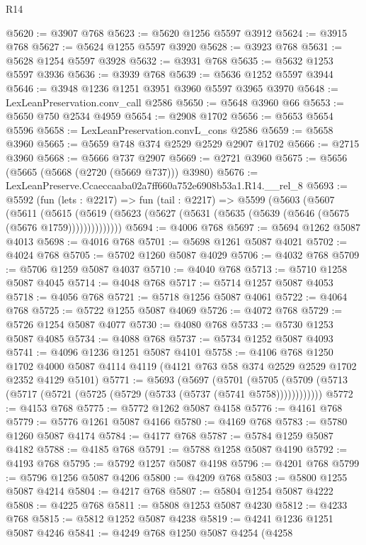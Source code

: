\begin{lexlean}{R14}
\begin{coremodule}
@5620 := @3907 @768
@5623 := @5620 @1256 @5597 @3912
@5624 := @3915 @768
@5627 := @5624 @1255 @5597 @3920
@5628 := @3923 @768
@5631 := @5628 @1254 @5597 @3928
@5632 := @3931 @768
@5635 := @5632 @1253 @5597 @3936
@5636 := @3939 @768
@5639 := @5636 @1252 @5597 @3944
@5646 := @3948 @1236 @1251 @3951 @3960 @5597 @3965 @3970
@5648 := LexLeanPreservation.conv_call @2586
@5650 := @5648 @3960 @66
@5653 := @5650 @750 @2534 @4959
@5654 := @2908 @1702
@5656 := @5653 @5654 @5596
@5658 := LexLeanPreservation.convL_cons @2586
@5659 := @5658 @3960
@5665 := @5659 @748 @374 @2529 @2529 @2907 @1702
@5666 := @2715 @3960
@5668 := @5666 @737 @2907
@5669 := @2721 @3960
@5675 := @5656 (@5665 (@5668 (@2720 (@5669 @737))) @3980)
@5676 := LexLeanPreserve.Ccaeccaaba02a7ff660a752e6908b53a1.R14.__rel_8
@5693 := @5592
    (fun (lets : @2217) =>
    fun (tail : @2217) =>
    @5599
      (@5603
        (@5607
          (@5611
            (@5615
              (@5619 (@5623 (@5627 (@5631 (@5635 (@5639 (@5646 (@5675 (@5676 @1759))))))))))))))
@5694 := @4006 @768
@5697 := @5694 @1262 @5087 @4013
@5698 := @4016 @768
@5701 := @5698 @1261 @5087 @4021
@5702 := @4024 @768
@5705 := @5702 @1260 @5087 @4029
@5706 := @4032 @768
@5709 := @5706 @1259 @5087 @4037
@5710 := @4040 @768
@5713 := @5710 @1258 @5087 @4045
@5714 := @4048 @768
@5717 := @5714 @1257 @5087 @4053
@5718 := @4056 @768
@5721 := @5718 @1256 @5087 @4061
@5722 := @4064 @768
@5725 := @5722 @1255 @5087 @4069
@5726 := @4072 @768
@5729 := @5726 @1254 @5087 @4077
@5730 := @4080 @768
@5733 := @5730 @1253 @5087 @4085
@5734 := @4088 @768
@5737 := @5734 @1252 @5087 @4093
@5741 := @4096 @1236 @1251 @5087 @4101
@5758 := @4106
    @768
    @1250
    @1702
    @4000
    @5087
    @4114
    @4119
    (@4121 @763 @58 @374 @2529 @2529 @1702 @2352 @4129 @5101)
@5771 := @5693
    (@5697
      (@5701 (@5705 (@5709 (@5713 (@5717 (@5721 (@5725 (@5729 (@5733 (@5737 (@5741 @5758))))))))))))
@5772 := @4153 @768
@5775 := @5772 @1262 @5087 @4158
@5776 := @4161 @768
@5779 := @5776 @1261 @5087 @4166
@5780 := @4169 @768
@5783 := @5780 @1260 @5087 @4174
@5784 := @4177 @768
@5787 := @5784 @1259 @5087 @4182
@5788 := @4185 @768
@5791 := @5788 @1258 @5087 @4190
@5792 := @4193 @768
@5795 := @5792 @1257 @5087 @4198
@5796 := @4201 @768
@5799 := @5796 @1256 @5087 @4206
@5800 := @4209 @768
@5803 := @5800 @1255 @5087 @4214
@5804 := @4217 @768
@5807 := @5804 @1254 @5087 @4222
@5808 := @4225 @768
@5811 := @5808 @1253 @5087 @4230
@5812 := @4233 @768
@5815 := @5812 @1252 @5087 @4238
@5819 := @4241 @1236 @1251 @5087 @4246
@5841 := @4249
    @768
    @1250
    @5087
    @4254
    (@4258

\end{coremodule}
\end{lexlean}

